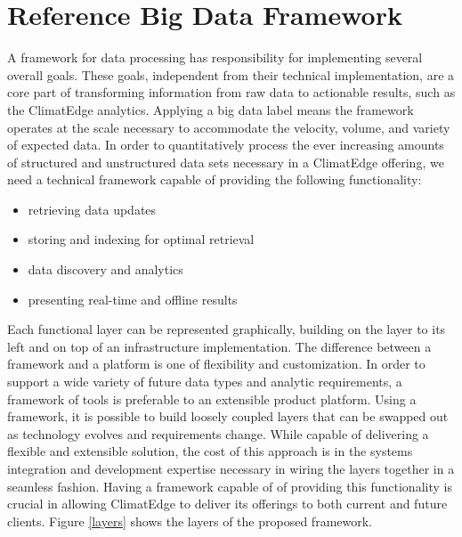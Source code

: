 \section{Reference Big Data Framework}
A framework for data processing has responsibility for implementing several overall goals. These goals, independent from their technical implementation, are a core part of transforming information from raw data to actionable results, such as the ClimatEdge\texttrademark{} analytics. Applying a big data label means the framework operates at the scale necessary to accommodate the velocity, volume, and variety of expected data. In order to quantitatively process the ever increasing amounts of structured and unstructured data sets necessary in a ClimatEdge\texttrademark{} offering, we need a technical framework capable of providing the following functionality:
\begin{itemize}
	\item retrieving data updates
	\item storing and indexing for optimal retrieval
	\item data discovery and analytics
	\item presenting real-time and offline results
\end{itemize}
Each functional layer can be represented graphically, building on the layer to its left and on top of an infrastructure implementation. The difference between a framework and a platform is one of flexibility and customization.  In order to support a wide variety of future data types and analytic requirements, a framework of tools is preferable to an extensible product platform. Using a framework, it is possible to build loosely coupled layers that can be swapped out as technology evolves and requirements change. While capable of delivering a flexible and extensible solution, the cost of this approach is in the systems integration and development expertise necessary in wiring the layers together in a seamless fashion. Having a framework capable of of providing this functionality is crucial in allowing ClimatEdge\texttrademark{} to deliver its offerings to both current and future clients. Figure \ref{layers} shows the layers of the proposed framework.
